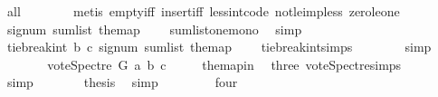 \begin{isabellebody}
\ all{}{}{\isacharunderscore}{\kern0pt}{}\isanewline
\ \ \ \ \ \ \isamarkupfalse%
\ {\isacharparenleft}{\kern0pt}metis\ empty{\isacharunderscore}{\kern0pt}iff\ insert{\isacharunderscore}{\kern0pt}iff\ less{\isacharunderscore}{\kern0pt}int{\isacharunderscore}{\kern0pt}code{\isacharparenleft}{\kern0pt}{}{\isacharparenright}{\kern0pt}\ not{\isacharunderscore}{\kern0pt}le{\isacharunderscore}{\kern0pt}imp{\isacharunderscore}{\kern0pt}less\ zero{\isacharunderscore}{\kern0pt}le{\isacharunderscore}{\kern0pt}one{\isacharparenright}{\kern0pt}\ \isanewline
\ \ \ \ \isamarkupfalse%
\ \isamarkupfalse%
\ {\isachardoublequoteopen}signum\ {\isacharparenleft}{\kern0pt}sum{\isacharunderscore}{\kern0pt}list\ the{\isacharunderscore}{\kern0pt}map{\isacharparenright}{\kern0pt}\ {\isacharequal}{\kern0pt}\ {}{\isachardoublequoteclose}\ \isamarkupfalse%
\ sumlist{\isacharunderscore}{\kern0pt}one{\isacharunderscore}{\kern0pt}mono\ \isamarkupfalse%
\ simp\isanewline
\ \ \ \ \isamarkupfalse%
\ \isamarkupfalse%
\ {\isachardoublequoteopen}tie{\isacharunderscore}{\kern0pt}break{\isacharunderscore}{\kern0pt}int\ b\ c\ {\isacharparenleft}{\kern0pt}signum\ {\isacharparenleft}{\kern0pt}sum{\isacharunderscore}{\kern0pt}list\ the{\isacharunderscore}{\kern0pt}map{\isacharparenright}{\kern0pt}{\isacharparenright}{\kern0pt}\ {\isacharequal}{\kern0pt}\ {}{\isachardoublequoteclose}\ \isamarkupfalse%
\ tie{\isacharunderscore}{\kern0pt}break{\isacharunderscore}{\kern0pt}int{\isachardot}{\kern0pt}simps\isanewline
\ \ \ \ \ \ \isamarkupfalse%
\ simp\isanewline
\ \ \ \ \isamarkupfalse%
\ \isamarkupfalse%
\ {\isachardoublequoteopen}vote{\isacharunderscore}{\kern0pt}Spectre\ G\ a\ b\ c\ {\isacharequal}{\kern0pt}\ {}\ {\isachardoublequoteclose}\ \isamarkupfalse%
\ the{\isacharunderscore}{\kern0pt}map{\isacharunderscore}{\kern0pt}in\ \isamarkupfalse%
\ three\ vote{\isacharunderscore}{\kern0pt}Spectre{\isachardot}{\kern0pt}simps\isanewline
\ \ \ \ \ \ \isamarkupfalse%
\ simp\isanewline
\ \ \ \ \isamarkupfalse%
\ \isamarkupfalse%
\ {\isacharquery}{\kern0pt}thesis\ \isamarkupfalse%
\ simp\isanewline
\ \ \isamarkupfalse%
\isanewline
\ \ \ \ \isamarkupfalse%
\ four\ \isanewline
\ \ \ \ \isamarkupfalse%

\end{isabellebody}
